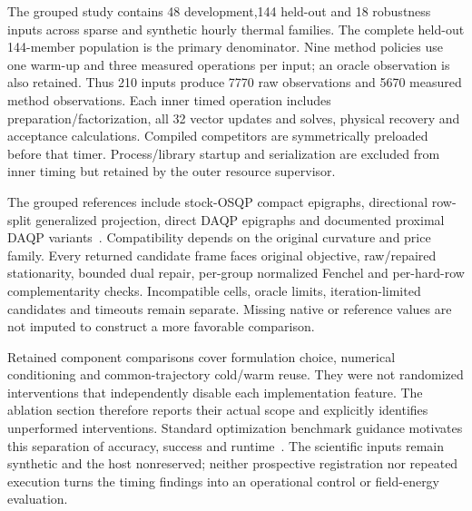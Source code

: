 The grouped study contains 48 development,144 held-out and 18 robustness
inputs across sparse and synthetic hourly thermal families. The
complete held-out 144-member population is the primary denominator.
Nine method policies use one warm-up and three measured operations
per input; an oracle observation is also retained. Thus 210 inputs
produce 7770 raw observations and 5670 measured method observations.
Each inner timed operation includes preparation/factorization,
all 32 vector updates and solves, physical recovery and acceptance
calculations. Compiled competitors are symmetrically preloaded before
that timer. Process/library startup and serialization are excluded
from inner timing but retained by the outer resource supervisor.

The grouped references include stock-OSQP compact epigraphs,
directional row-split generalized projection, direct DAQP epigraphs
and documented proximal DAQP variants~\cite{daqpprox}. Compatibility
depends on the original curvature and price family. Every returned
candidate frame faces original objective, raw/repaired stationarity,
bounded dual repair, per-group normalized Fenchel and per-hard-row
complementarity checks. Incompatible cells, oracle limits,
iteration-limited candidates and timeouts remain separate. Missing
native or reference values are not imputed to construct a more
favorable comparison.

Retained component comparisons cover formulation choice, numerical
conditioning and common-trajectory cold/warm reuse. They were not
randomized interventions that independently disable each implementation
feature. The ablation section therefore reports their actual scope
and explicitly identifies unperformed interventions. Standard
optimization benchmark guidance motivates this separation of
accuracy, success and runtime~\cite{dolan,cutest}. The scientific
inputs remain synthetic and the host nonreserved; neither prospective
registration nor repeated execution turns the timing findings into
an operational control or field-energy evaluation.

